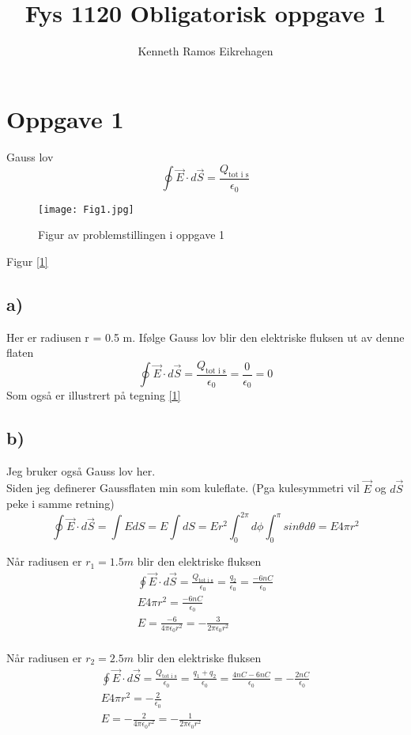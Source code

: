 \documentclass[a4paper,12pt,norsk]{article}
\title{Fys 1120 Obligatorisk oppgave 1}
\author{Kenneth Ramos Eikrehagen}
\begin{document}
\maketitle
\tableofcontents
\section{Oppgave 1}
Gauss lov
$$\oint \vec{E} \cdot d\vec{S} = \frac{Q_{\text{tot i s}}}{\epsilon_0}$$
\begin{figure}[h!]
\texttt{[image: Fig1.jpg]} 
\caption{Figur av problemstillingen i oppgave 1}
\label{1}
\end{figure} 
Figur \vref{1}
\subsection{a)}
Her er radiusen r = 0.5 m. Ifølge Gauss lov blir den elektriske fluksen ut av denne flaten 
$$\oint \vec{E} \cdot d\vec{S} = \frac{Q_{\text{tot i s}}}{\epsilon_0} =  \frac{0}{\epsilon_0} = 0$$ Som også er illustrert på tegning \vref{1}

\subsection{b)}
Jeg bruker også Gauss lov her.\\
Siden jeg definerer Gaussflaten min som kuleflate. (Pga kulesymmetri vil $\vec{E}$ og $d\vec{S}$ peke i samme retning) $$\oint \vec{E} \cdot d\vec{S} =\int EdS = E\int dS =Er^2 \int^{2\pi}_0d\phi \int_0^{\pi} sin\theta d\theta = E4\pi r^2 $$

Når radiusen er $r_1 = 1.5m$ blir den elektriske fluksen 
\begin{align*}
\oint \vec{E} \cdot d\vec{S} = \frac{Q_{\text{tot i s}}}{\epsilon_0}= \frac{q_2}{\epsilon_0} = \frac{-6nC}{\epsilon_0}\\
E4\pi r^2 = \frac{-6nC}{\epsilon_0}\\
E = \frac{-6}{4\pi \epsilon_0r^2} = -\frac{3}{2\pi \epsilon_0r^2}
\end{align*}
 \\

Når radiusen er $r_2= 2.5 m$ blir den elektriske fluksen 
\begin{align*}
\oint \vec{E} \cdot d\vec{S} = \frac{Q_{\text{tot i s}}}{\epsilon_0}= \frac{q_1+q_2}{\epsilon_0} = \frac{4nC -6nC}{\epsilon_0} = -\frac{2nC}{\epsilon_0} \\
E4\pi r^2 = -\frac{2}{\epsilon_0}\\
E = -\frac{2}{4\pi \epsilon_0r^2} = -\frac{1}{2\pi \epsilon_0r^2}
\end{align*}
\end{document}
